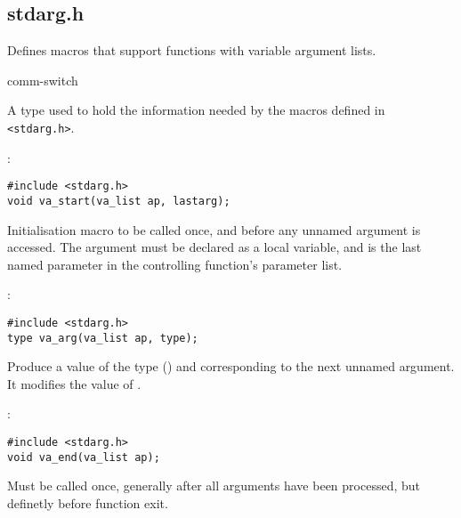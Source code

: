 \subsection{stdarg.h}
\label{sec:stdargh}

Defines macros that support functions with
variable argument lists.

\begin{Ventry2}{comm-switch  }

\item[va\_list]
\label{item:valist}

	A type used to hold the information needed by the macros defined
in \verb+<stdarg.h>+.

\item[va\_start]
\label{item:vastart}
:
\begin{production}
\begin{verbatim}
#include <stdarg.h>
void va_start(va_list ap, lastarg);
\end{verbatim}
\end{production}

     Initialisation macro to be called once, and before any unnamed
     argument is accessed. The argument  must be declared as a
     local variable, and  is the last named parameter in
     the controlling function's parameter list.

\item[va\_arg]
\label{item:vaarg}
:
\begin{production}
\begin{verbatim}
#include <stdarg.h>
type va_arg(va_list ap, type);
\end{verbatim}
\end{production}

     Produce a value of the type () and corresponding to the
     next unnamed argument. It modifies the value of .

\item[va\_end]
\label{item:vaend}
:
\begin{production}
\begin{verbatim}
#include <stdarg.h>
void va_end(va_list ap);
\end{verbatim}
\end{production}

     Must be called once, generally after all arguments have been
processed, but definetly before function exit.

\end{Ventry2}


